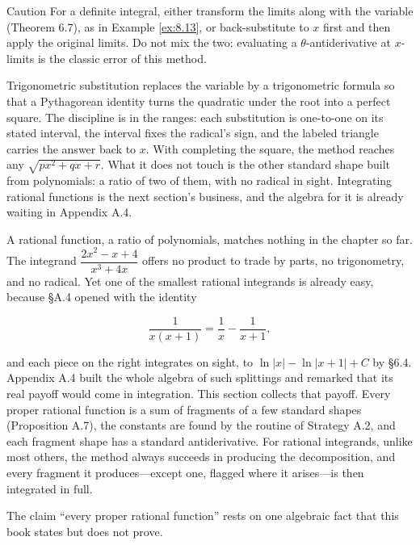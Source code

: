 \documentclass[a4paper,12pt,oneside]{memoir}
\begin{document}
\begin{envcaution}{Caution}{}{}
For a definite integral, either transform the limits along with the variable (Theorem 6.7), as in Example \ref{ex:8.13}, or back-substitute to \(x\) first and then apply the original limits. Do not mix the two: evaluating a \(\theta\)-antiderivative at \(x\)-limits is the classic error of this method.
\end{envcaution}
Trigonometric substitution replaces the variable by a trigonometric formula so that a Pythagorean identity turns the quadratic under the root into a perfect square. The discipline is in the ranges: each substitution is one-to-one on its stated interval, the interval fixes the radical’s sign, and the labeled triangle carries the answer back to \(x\). With completing the square, the method reaches any \(\sqrt{px^{2} + qx + r}\). What it does not touch is the other standard shape built from polynomials: a ratio of two of them, with no radical in sight. Integrating rational functions is the next section’s business, and the algebra for it is already waiting in Appendix A.4.


A rational function, a ratio of polynomials, matches nothing in the chapter so far. The integrand \(\dfrac{2x^{2} - x + 4}{x^{3} + 4x}\) offers no product to trade by parts, no trigonometry, and no radical. Yet one of the smallest rational integrands is already easy, because §A.4 opened with the identity

\[ \frac{1}{x(x + 1)} = \frac{1}{x} - \frac{1}{x + 1}, \]

and each piece on the right integrates on sight, to \(\ln\lvert x\rvert - \ln\lvert x + 1\rvert + C\) by §6.4. Appendix A.4 built the whole algebra of such splittings and remarked that its real payoff would come in integration. This section collects that payoff. Every proper rational function is a sum of fragments of a few standard shapes (Proposition A.7), the constants are found by the routine of Strategy A.2, and each fragment shape has a standard antiderivative. For rational integrands, unlike most others, the method always succeeds in producing the decomposition, and every fragment it produces—except one, flagged where it arises—is then integrated in full.

The claim “every proper rational function” rests on one algebraic fact that this book states but does not prove.
\end{document}
